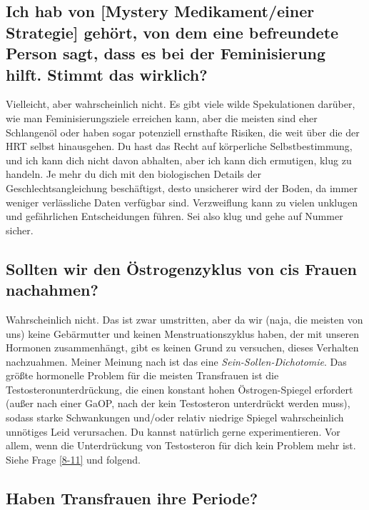 \documentclass{article}
\begin{document}
\subsection{Ich hab von [Mystery Medikament/einer Strategie] gehört, von dem eine befreundete Person sagt, dass es bei der Feminisierung hilft. Stimmt das wirklich?}

Vielleicht, aber wahrscheinlich nicht. Es gibt viele wilde Spekulationen darüber, wie man Feminisierungsziele erreichen kann, aber die meisten sind eher Schlangenöl oder haben sogar potenziell ernsthafte Risiken, die weit über die der HRT selbst hinausgehen. Du hast das Recht auf körperliche Selbstbestimmung, und ich kann dich nicht davon abhalten, aber ich kann dich ermutigen, klug zu handeln. Je mehr du dich mit den biologischen Details der Geschlechtsangleichung beschäftigst, desto unsicherer wird der Boden, da immer weniger verlässliche Daten verfügbar sind. Verzweiflung kann zu vielen unklugen und gefährlichen Entscheidungen führen. Sei also klug und gehe auf Nummer sicher.

\subsection{Sollten wir den Östrogenzyklus von cis Frauen nachahmen?}\label{11-10}

Wahrscheinlich nicht. Das ist zwar umstritten, aber da wir (naja, die meisten von uns) keine Gebärmutter und keinen Menstruationszyklus haben, der mit unseren Hormonen zusammenhängt, gibt es keinen Grund zu versuchen, dieses Verhalten nachzuahmen. Meiner Meinung nach ist das eine \textit{Sein-Sollen-Dichotomie}. Das größte hormonelle Problem für die meisten Transfrauen ist die Testosteronunterdrückung, die einen konstant hohen Östrogen-Spiegel erfordert (außer nach einer GaOP, nach der kein Testosteron unterdrückt werden muss), sodass starke Schwankungen und/oder relativ niedrige Spiegel wahrscheinlich unnötiges Leid verursachen. Du kannst natürlich gerne experimentieren. Vor allem, wenn die Unterdrückung von Testosteron für dich kein Problem mehr ist. Siehe Frage \ref{8-11} und folgend.

\subsection{Haben Transfrauen ihre Periode?}
\end{document}
